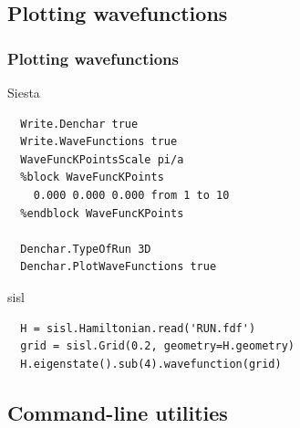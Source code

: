 \subsection{Plotting wavefunctions}

\begin{frame}[fragile]
  \frametitle{Plotting wavefunctions}

  \begin{block}{Siesta}
\begin{verbatim}
  Write.Denchar true
  Write.WaveFunctions true
  WaveFuncKPointsScale pi/a
  %block WaveFuncKPoints
    0.000 0.000 0.000 from 1 to 10
  %endblock WaveFuncKPoints

  Denchar.TypeOfRun 3D
  Denchar.PlotWaveFunctions true
\end{verbatim}

  \end{block}

  \begin{block}{sisl}

\begin{verbatim}
  H = sisl.Hamiltonian.read('RUN.fdf')
  grid = sisl.Grid(0.2, geometry=H.geometry)
  H.eigenstate().sub(4).wavefunction(grid)
\end{verbatim}
  \end{block}

\end{frame}


\subsection{Command-line utilities}

